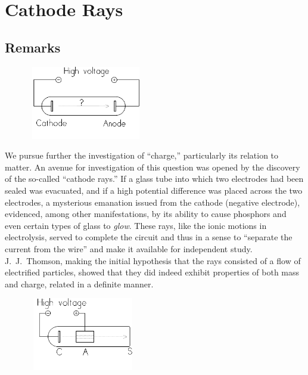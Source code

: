 \chapter{Cathode Rays}\label{ch:thomson}



\renewcommand{\theequation}{\arabic{equation}}

\section*{Remarks}

\begin{figure}
  \begin{center}
    \includegraphics[width=2in,height=1.26042in]{images/02_thomson/image001.png}
  \end{center}
\end{figure}

\indent

We pursue
further the investigation of ``charge,'' particularly its relation to
matter. An avenue for investigation of this question was opened by the
discovery of the so-called ``cathode rays.'' If a glass tube into which
two electrodes had been sealed was evacuated, and if a high potential
difference was placed across the two electrodes, a mysterious emanation
issued from the cathode (negative electrode), evidenced, among other
manifestations, by its ability to cause phosphors and even certain types
of glass to \emph{glow}. These rays, like the ionic motions in
electrolysis, served to complete the circuit and thus in a sense to
``separate the current from the wire'' and make it available for
independent study. J.\ J.\ Thomson, making the initial hypothesis that the
rays consisted of a flow of electrified particles, showed that they did
indeed exhibit properties of both mass and charge, related in a definite
manner.
\begin{figure}
  \begin{center}
    \includegraphics[width=1.9in,height=1.26042in]{images/02_thomson/image003.png}
  \end{center}
\end{figure}

